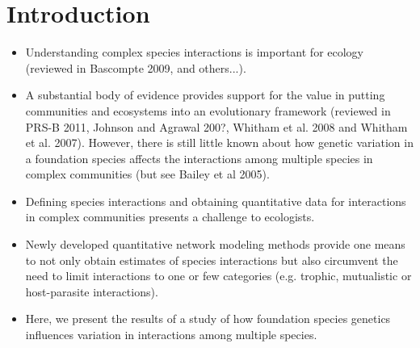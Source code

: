 \documentclass[11pt]{amsart}
\begin{document}
\section{Introduction}
\begin{itemize}
\item Understanding complex species interactions is important for
  ecology (reviewed in Bascompte 2009, and others...). 
\item A substantial body of evidence provides support for the value in
  putting communities and ecosystems into an evolutionary framework
  (reviewed in PRS-B 2011, Johnson and Agrawal 200?, Whitham et
  al. 2008 and Whitham et al. 2007). However, there is still little
  known about how genetic variation in a foundation species affects
  the interactions among multiple species in complex communities (but
  see Bailey et al 2005).
\item Defining species interactions and obtaining quantitative data
  for interactions in complex communities presents a challenge to
  ecologists.
\item Newly developed quantitative network modeling methods provide
  one means to not only obtain estimates of species interactions but
  also circumvent the need to limit interactions to one or few
  categories (e.g. trophic, mutualistic or host-parasite
  interactions).
\item Here, we present the results of a study of how foundation
  species genetics influences variation in interactions among multiple
  species.
\end{itemize}
\end{document}
